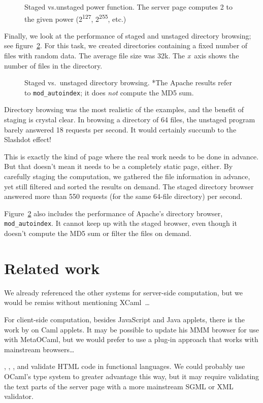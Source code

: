 \documentclass[preprint]{acm_proc_article-sp}
\def\MOC{MetaOCaml}
\newcommand{\myfig}[3]{%
  \begin{figure}[tbp]%
    #3%
    \caption{#2}%
    \label{fig:#1}%
  \end{figure}}
\newcommand{\gnuplot}[2]{%
  \myfig{#1}{#2}{}}
\begin{document}
\gnuplot{power}{Staged vs.\@ unstaged power function.  The
  server page computes 2 to the given power
  (2\textsuperscript{127}, 2\textsuperscript{255}, etc.)}

Finally, we look at the performance of staged and unstaged
directory browsing; see figure~\ref{fig:browse}.  For this task,
we created directories containing a fixed number of files with
random data.  The average file size was 32k.  The \emph{x}~axis
shows the number of files in the directory.  

\gnuplot{browse}{Staged vs.~unstaged directory browsing.  *The
  Apache results refer to \texttt{mod\_autoindex}; it does
  \emph{not} compute the MD5 sum.}

Directory browsing was the most realistic of the examples, and
the benefit of staging is crystal clear.  In browsing a
directory of 64 files, the unstaged program barely answered 18
requests per second.  It would certainly succumb to the Slashdot
effect!

This is exactly the kind of page where the real work needs to be
done in advance.  But that doesn't mean it needs to be a
completely static page, either.  By carefully staging the
computation, we gathered the file information in advance, yet
still filtered and sorted the results on demand.  The staged
directory browser answered more than 550 requests (for the same
64-file directory) per second.

Figure~\ref{fig:browse} also includes the performance of
Apache's directory browser, \texttt{mod\_autoindex}.  It cannot
keep up with the staged browser, even though it doesn't compute
the MD5 sum or filter the files on demand.

\section{Related work}
\label{sec:related}

We already referenced the other systems for server-side
computation, but we would be remiss without mentioning
XCaml~\cite{baretta04xcaml}\ldots

For client-side computation, besides JavaScript and Java
applets, there is the work by \citet{rouaix96web} on Caml
applets.  It may be possible to update his MMM browser for use
with \MOC{}, but we would prefer to use a plug-in approach that
works with mainstream browsers\ldots

\citet{elsman04typing}, \citet{wallace99haxml},
\citet{hosoya03xduce}, and \citet{ohl04xhtml} validate HTML code
in functional languages.  We could probably use OCaml's type
system to greater advantage this way, but it may require
validating the text parts of the server page with a more
mainstream SGML or XML validator.
\end{document}
